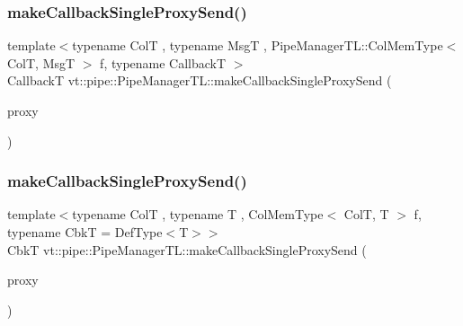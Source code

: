 \mbox{\label{structvt_1_1pipe_1_1_pipe_manager_t_l_a0da1b385495f0a625754f17db45a4066}} 
\subsubsection{\texorpdfstring{make\+Callback\+Single\+Proxy\+Send()}{makeCallbackSingleProxySend()}\hspace{0.1cm}{\footnotesize\ttfamily [2/3]}}
{\footnotesize\ttfamily template$<$typename ColT , typename MsgT , Pipe\+Manager\+T\+L\+::\+Col\+Mem\+Type$<$ Col\+T, Msg\+T $>$ f, typename CallbackT $>$ \\
CallbackT vt\+::pipe\+::\+Pipe\+Manager\+T\+L\+::make\+Callback\+Single\+Proxy\+Send (\begin{DoxyParamCaption}\item[{typename Col\+T\+::\+Proxy\+Type}]{proxy }\end{DoxyParamCaption})}

\mbox{\label{structvt_1_1pipe_1_1_pipe_manager_t_l_a2c8c3a5aca22b2526fe68dd543a8a888}} 
\subsubsection{\texorpdfstring{make\+Callback\+Single\+Proxy\+Send()}{makeCallbackSingleProxySend()}\hspace{0.1cm}{\footnotesize\ttfamily [3/3]}}
{\footnotesize\ttfamily template$<$typename ColT , typename T , Col\+Mem\+Type$<$ Col\+T, T $>$ f, typename CbkT  = Def\+Type$<$\+T$>$$>$ \\
CbkT vt\+::pipe\+::\+Pipe\+Manager\+T\+L\+::make\+Callback\+Single\+Proxy\+Send (\begin{DoxyParamCaption}\item[{typename Col\+T\+::\+Proxy\+Type}]{proxy }\end{DoxyParamCaption})}

